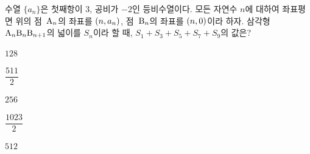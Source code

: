 수열 $\{a_n\}$은 첫째항이 $3$, 공비가 $-2$인 등비수열이다. 모든 자연수 $n$에 대하여 좌표평면 위의 점~$\mathrm{A}_n$의 좌표를 $(n{,}\mkern3mu\mathopen{}a_n)$, 점~$\mathrm{B}_n$의 좌표를 $(n{,}\mkern3mu\mathopen{}0)$이라 하자. 삼각형~$\mathrm{A}_n\mathrm{B}_n\mathrm{B}_{n+1}$의 넓이를 $S_n$이라 할 때, $S_1+S_3+S_5+S_7+S_9$의 값은?
\begin{choices32}{\rule[-3ex]{0pt}{8ex}$128$}{\rule[-3ex]{0pt}{8ex}$\dfrac{511}{2}$}{\rule[-3ex]{0pt}{8ex}$256$}{\rule[-3ex]{0pt}{8ex}$\dfrac{1023}{2}$}{\rule[-3ex]{0pt}{8ex}$512$}\end{choices32}
